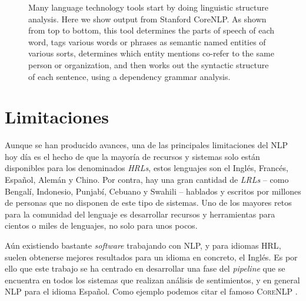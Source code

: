 \begin{figure}[bth]
  \caption[Ejemplo de parseo de dependencias]{Many language technology tools
start by doing linguistic structure analysis. Here we show output from Stanford
CoreNLP. As shown from top to bottom, this tool determines the parts of speech
of each word, tags various words or phrases as semantic named entities of
various sorts, determines which entity mentions co-refer to the same person or
organization, and then works out the syntactic structure of each sentence, using
a dependency grammar analysis.}
  \label{fig:corenlp}
\end{figure}

\section{Limitaciones}
\label{sec:nlplimits}

Aunque se han producido avances, una de las principales limitaciones del
\ac{NLP} hoy día es el hecho de que la mayoría de recursos y sistemas solo están
disponibles para los denominados \emph{\acp{HRL}}, estos lenguajes son el Inglés, Francés, Español, Alemán y
Chino. Por contra, hay una gran cantidad de \emph{\acp{LRL}}
-- como Bengalí, Indonesio,
Punjabí, Cebuano y Swahili -- hablados y escritos por millones de personas que
no disponen de este tipo de sistemas. Uno de los mayores retos para la comunidad
del lenguaje es desarrollar recursos y herramientas para cientos o miles de
lenguajes, no solo para unos pocos.

Aún existiendo bastante \emph{software} trabajando con \ac{NLP}, y para idiomas
\ac{HRL}, suelen obtenerse mejores resultados para un idioma en concreto, el
Inglés. Es por ello que este trabajo se ha centrado en desarrollar una fase del
\emph{pipeline} que se encuentra en todos los sistemas que realizan análisis de
sentimientos, y en general \ac{NLP} para el idioma Español. Como ejemplo podemos
citar el famoso \textsc{CoreNLP} \cite{Manning2014}.

